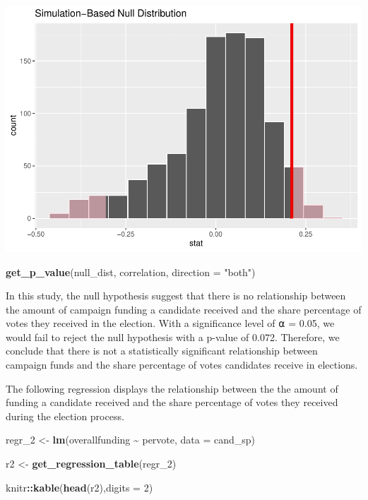 \documentclass[
]{article}
\newenvironment{Shaded}{\begin{snugshade}}{\end{snugshade}}
\newcommand{\AttributeTok}[1]{\textcolor[rgb]{0.13,0.29,0.53}{#1}}
\newcommand{\DecValTok}[1]{\textcolor[rgb]{0.00,0.00,0.81}{#1}}
\newcommand{\FunctionTok}[1]{\textcolor[rgb]{0.13,0.29,0.53}{\textbf{#1}}}
\newcommand{\NormalTok}[1]{#1}
\newcommand{\OtherTok}[1]{\textcolor[rgb]{0.56,0.35,0.01}{#1}}
\newcommand{\SpecialCharTok}[1]{\textcolor[rgb]{0.81,0.36,0.00}{\textbf{#1}}}
\newcommand{\StringTok}[1]{\textcolor[rgb]{0.31,0.60,0.02}{#1}}
\begin{document}
\includegraphics{index_files/figure-latex/unnamed-chunk-5-1.pdf}

\begin{Shaded}
\begin{Highlighting}[]
\FunctionTok{get\_p\_value}\NormalTok{(null\_dist, correlation, }\AttributeTok{direction =} \StringTok{"both"}\NormalTok{)}
\end{Highlighting}
\end{Shaded}

In this study, the null hypothesis suggest that there is no relationship
between the amount of campaign funding a candidate received and the
share percentage of votes they received in the election. With a
significance level of ⍺ = 0.05, we would fail to reject the null
hypothesis with a p-value of 0.072. Therefore, we conclude that there is
not a statistically significant relationship between campaign funds and
the share percentage of votes candidates receive in elections.

The following regression displays the relationship between the the
amount of funding a candidate received and the share percentage of votes
they received during the election process.

\begin{Shaded}
\begin{Highlighting}[]
\NormalTok{regr\_2 }\OtherTok{\textless{}{-}} \FunctionTok{lm}\NormalTok{(overallfunding }\SpecialCharTok{\textasciitilde{}}\NormalTok{ pervote, }\AttributeTok{data =}\NormalTok{ cand\_sp)}

\NormalTok{r2 }\OtherTok{\textless{}{-}} \FunctionTok{get\_regression\_table}\NormalTok{(regr\_2)}

\NormalTok{knitr}\SpecialCharTok{::}\FunctionTok{kable}\NormalTok{(}\FunctionTok{head}\NormalTok{(r2),}\AttributeTok{digits =} \DecValTok{2}\NormalTok{)}
\end{Highlighting}
\end{Shaded}
\end{document}
